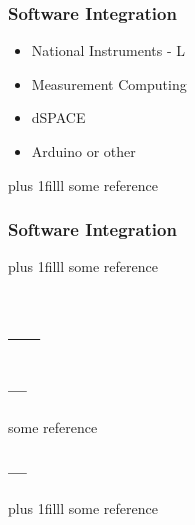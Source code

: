 \documentclass[fleqn]{beamer} %
\newcommand{\sectiontitleIII}{Software Integration}
\newcommand{\sectiontitleIV}{---}
\newcommand{\btVFill}{\vskip0pt plus 1filll}
\begin{document}
\begin{frame}[label=sectionIII] \small
\frametitle{\sectiontitleIII}
\bigskip

\begin{itemize}
	\item National Instruments - L \vspace{6mm}\\
	
	\item Measurement Computing  \vspace{6mm}\\
	
	\item dSPACE  \vspace{6mm}\\
	
	\item Arduino or other 
	
\end{itemize}


\btVFill
\tiny{some reference}		

\end{frame}

\begin{frame}[label=sectionIII] \small
\frametitle{\sectiontitleIII}
\bigskip


\btVFill
\tiny{some reference}	
\end{frame}

\section{\sectiontitleIV}	

\begin{frame}[label=sectionIV] \small
\frametitle{\sectiontitleIV}
\bigskip

\tiny{some reference}	
\end{frame}

\begin{frame}[label=sectionIV] \small
\frametitle{\sectiontitleIV}
\bigskip



\btVFill
\tiny{some reference}	
\end{frame}
\end{document}
